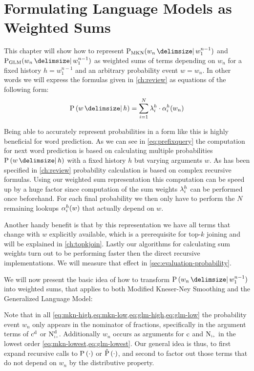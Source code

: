\chapter{Formulating Language Models as Weighted Sums}
\label{ch:weightedsum}

This chapter will show how to represent  $\ProbMKN{w_n}{w_1^{n-1}}$ and
$\ProbGLM{w_n}{w_1^{n-1}}$ as weighted sums of terms depending on $w_n$ for a
fixed history $h = w_1^{n-1}$ and an  arbitrary probability event $w = w_n$.
In other words we will express the formulas given in \cref{ch:review} as
equations of the following form:
\begin{equation}
  \label{eq:weightedsum}
  \Prob{w}{h} = \sum_{i = 1}^{N} \SumWeight_i^h \cdot \SumArg_i^h(w_n)
\end{equation}

Being able to accurately represent probabilities in a form like this is highly
beneficial for word prediction.
As we can see in \cref{eq:prefixquery} the computation for next word prediction
is based on calculating multiple probabilities $\Prob{w}{h}$ with a fixed
history $h$ but varying arguments $w$.
As has been specified in \cref{ch:review} probability calculation is based on
complex recursive formulas.
Using our weighted sum representation this computation can be speed up by
a huge factor since computation of the sum weights $\lambda^h_i$ can
be performed once beforehand.
For each final probability we then only have to perform the $N$ remaining
lookups $\alpha^h_i(w)$ that actually depend on $w$.

Another handy benefit is that by this representation we have all terms that
change with $w$ explicitly available, which is a prerequisite for top-$k$
joining and will be explained in \cref{ch:topkjoin}.
Lastly our algorithms for calculating sum weights turn out to be performing
faster
then the direct recursive implementations.
We will measure that effect in \cref{sec:evaluation-probability}.

We will now present the basic idea of how to transform $\Prob{w_n}{w_1^{n-1}}$
into weighted sums, that applies to both Modified Kneser-Ney Smoothing and
the Generalized Language Model:

Note that in all \cref{eq:mkn-high,eq:mkn-low,eq:glm-high,eq:glm-low} the
probability event $w_n$ only appears in the nominator of fractions, specifically
in the argument terms of $\DiscountedCount$ or $\DiscountedCount*$.
Additionally $w_n$ occurs as arguments for $\operatorname{c}$ and $\ContCountIp$ in the
lowest order \cref{eq:mkn-lowest,eq:glm-lowest}.
Our general idea is thus, to first expand recursive calls to
$\Prob(\DummyArg)$ or $\Prob*(\DummyArg)$, and second to factor
out those terms that do not depend on $w_n$ by the distributive property.

